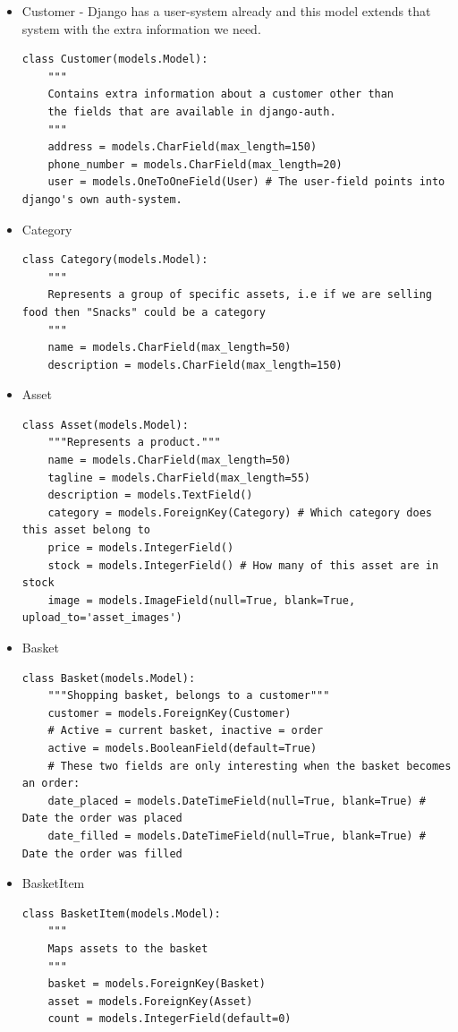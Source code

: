 \documentclass[12pt, a4paper,titlepage]{article}
\begin{document}
\newpage
\begin{itemize}
\setlength\itemsep{-1pt}
\item Customer - Django has a user-system already and this
model extends that system with the extra information we need.
\begin{lstlisting}
class Customer(models.Model):
    """
    Contains extra information about a customer other than 
    the fields that are available in django-auth.
    """
    address = models.CharField(max_length=150)
    phone_number = models.CharField(max_length=20)
    user = models.OneToOneField(User) # The user-field points into django's own auth-system.
\end{lstlisting}

\item Category
\begin{lstlisting}
class Category(models.Model):
    """ 
    Represents a group of specific assets, i.e if we are selling food then "Snacks" could be a category
    """
    name = models.CharField(max_length=50)
    description = models.CharField(max_length=150)
\end{lstlisting}

\item Asset
\begin{lstlisting}
class Asset(models.Model):
    """Represents a product."""
    name = models.CharField(max_length=50)
    tagline = models.CharField(max_length=55)
    description = models.TextField()
    category = models.ForeignKey(Category) # Which category does this asset belong to
    price = models.IntegerField()
    stock = models.IntegerField() # How many of this asset are in stock
    image = models.ImageField(null=True, blank=True, upload_to='asset_images')
\end{lstlisting}

\newpage
\item Basket 
\begin{lstlisting}
class Basket(models.Model):
    """Shopping basket, belongs to a customer"""
    customer = models.ForeignKey(Customer)
    # Active = current basket, inactive = order
    active = models.BooleanField(default=True)
    # These two fields are only interesting when the basket becomes an order:
    date_placed = models.DateTimeField(null=True, blank=True) # Date the order was placed
    date_filled = models.DateTimeField(null=True, blank=True) # Date the order was filled 
\end{lstlisting}

\item BasketItem
\begin{lstlisting}
class BasketItem(models.Model):
    """
    Maps assets to the basket
    """
    basket = models.ForeignKey(Basket)
    asset = models.ForeignKey(Asset)
    count = models.IntegerField(default=0)
\end{lstlisting}


\end{itemize}
\end{document}
